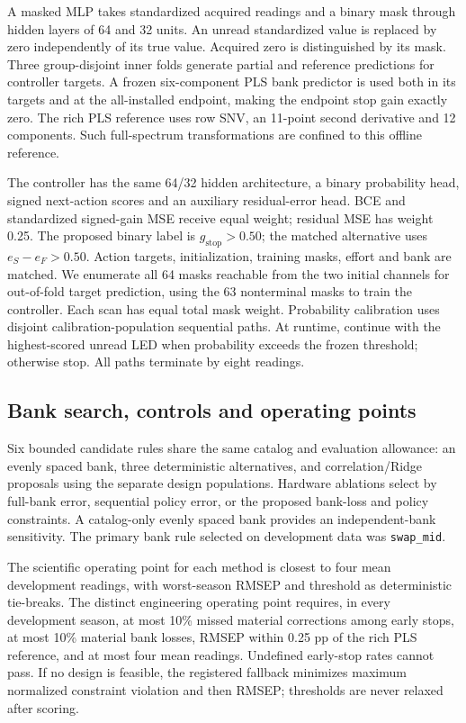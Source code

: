 \documentclass[11pt,a4paper]{article}
\begin{document}
A masked MLP takes standardized acquired readings and a binary mask through hidden layers of 64 and 32 units. An unread standardized value is replaced by zero independently of its true value. Acquired zero is distinguished by its mask. Three group-disjoint inner folds generate partial and reference predictions for controller targets. A frozen six-component PLS bank predictor is used both in its targets and at the all-installed endpoint, making the endpoint stop gain exactly zero. The rich PLS reference uses row SNV, an 11-point second derivative and 12 components. Such full-spectrum transformations are confined to this offline reference.

The controller has the same 64/32 hidden architecture, a binary probability head, signed next-action scores and an auxiliary residual-error head. BCE and standardized signed-gain MSE receive equal weight; residual MSE has weight 0.25. The proposed binary label is $g_{\mathrm{stop}}>0.50$; the matched alternative uses $e_S-e_F>0.50$. Action targets, initialization, training masks, effort and bank are matched. We enumerate all 64 masks reachable from the two initial channels for out-of-fold target prediction, using the 63 nonterminal masks to train the controller. Each scan has equal total mask weight. Probability calibration uses disjoint calibration-population sequential paths. At runtime, continue with the highest-scored unread LED when probability exceeds the frozen threshold; otherwise stop. All paths terminate by eight readings.

\subsection{Bank search, controls and operating points}
Six bounded candidate rules share the same catalog and evaluation allowance: an evenly spaced bank, three deterministic alternatives, and correlation/Ridge proposals using the separate design populations. Hardware ablations select by full-bank error, sequential policy error, or the proposed bank-loss and policy constraints. A catalog-only evenly spaced bank provides an independent-bank sensitivity. The primary bank rule selected on development data was \texttt{swap\_mid}.

The scientific operating point for each method is closest to four mean development readings, with worst-season RMSEP and threshold as deterministic tie-breaks. The distinct engineering operating point requires, in every development season, at most 10\% missed material corrections among early stops, at most 10\% material bank losses, RMSEP within 0.25 pp of the rich PLS reference, and at most four mean readings. Undefined early-stop rates cannot pass. If no design is feasible, the registered fallback minimizes maximum normalized constraint violation and then RMSEP; thresholds are never relaxed after scoring.
\end{document}
